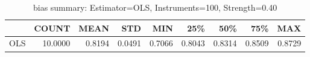 \begin{table}[ht]
\centering
\caption{bias summary: Estimator=OLS, Instruments=100, Strength=0.40}
\begin{tabular}{lrrrrrrrr}
\toprule
 & COUNT & MEAN & STD & MIN & 25\% & 50\% & 75\% & MAX \\
\midrule
OLS & 10.0000 & 0.8194 & 0.0491 & 0.7066 & 0.8043 & 0.8314 & 0.8509 & 0.8729 \\
\bottomrule
\end{tabular}
\end{table}
